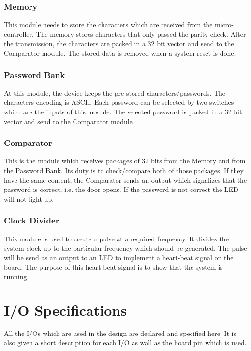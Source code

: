 \documentclass[a4paper, twoside]{report}
\begin{document}
\subsection{Memory}
\noindent This module needs to store the characters which are received from the micro-controller. The memory stores characters that only passed the parity check. After the transmission, the characters are packed in a 32 bit vector and send to the Comparator module. The stored data is removed when a system reset is done.\\  \par
\subsection{Password Bank}
\noindent At this module, the device keeps the pre-stored characters/passwords. The characters encoding is ASCII. Each password can be selected by two switches which are the inputs of this module. The selected password is packed in a 32 bit vector and send to the Comparator module.\\ \par
\subsection{Comparator}
\noindent This is the module which receives packages of 32 bits from the Memory and from the Password Bank. Its duty is to check/compare both of those packages. If they have the same content, the Comparator sends an output which signalizes that the password is correct, i.e. the door opens. If the password is not correct the LED will not light up.\\  \par
\subsection{Clock Divider}
\noindent This module is used to create a pulse at a required frequency. It divides the system clock up to the particular frequency which should be generated. The pulse will be send as an output to an LED to implement a heart-beat signal on the board. The purpose of this heart-beat signal is to show that the system is running.\\  \par

\chapter{I/O Specifications}
All the I/Os which are used in the design are declared and specified here. It is also given a short description for each I/O as wall as the board pin which is used. \par
\vspace{5mm} %
\end{document}
